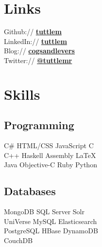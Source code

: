 \documentclass[letterpaper]{deedy-resume} %
\begin{document}
\begin{minipage}[t]{0.33\textwidth} %


\section{Links} 

Github:// \href{https://github.com/tuttlem}{\bf tuttlem} \\
LinkedIn:// \href{http://au.linkedin.com/in/tuttlem/}{\bf tuttlem} \\
Blog:// \href{http://tuttlem.github.io/}{\bf cogsandlevers} \\
Twitter:// \href{https://twitter.com/tuttlemr}{\bf @tuttlemr} \\

\sectionspace %


\section{Skills}

\subsection{Programming}

C\# \textbullet{} HTML/CSS \textbullet{} JavaScript \textbullet{} C \\
C++ \textbullet{} Haskell \textbullet{} Assembly \textbullet{} \LaTeX\ \\ 
Java \textbullet{} Objective-C \textbullet{} Ruby \textbullet{} Python  \\

\sectionspace %

\subsection{Databases}

MongoDB \textbullet{} SQL Server \textbullet{} Solr \\
UniVerse \textbullet{} MySQL \textbullet{} Elasticsearch \\
PostgreSQL \textbullet{} HBase \textbullet{} DynamoDB \\ 
CouchDB \textbullet{} 


\end{minipage}
\end{document}
